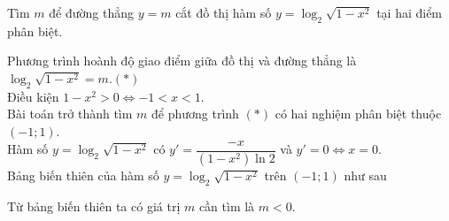 \begin{bt}%
Tìm $m$ để đường thẳng $y=m$ cắt đồ thị hàm số $y=\log_2\sqrt{1-x^2}$ tại hai điểm phân biệt.
\loigiai
{Phương trình hoành độ giao điểm giữa đồ thị và đường thẳng là $\log_2\sqrt{1-x^2}=m$.\quad $(*)$\\
Điều kiện $1-x^2>0\Leftrightarrow -1<x<1$.\\
Bài toán trở thành tìm $m$ để phương trình $(*)$ có hai nghiệm phân biệt thuộc $(-1;1)$.\\
Hàm số $y=\log_2\sqrt{1-x^2}$ có $y'=\dfrac{-x}{(1-x^2)\ln 2}$ và $y'=0\Leftrightarrow x=0$.\\
Bảng biến thiên của hàm số $y=\log_2\sqrt{1-x^2}$ trên $(-1;1)$ như sau
\begin{center}
\end{center}
Từ bảng biến thiên ta có giá trị $m$ cần tìm là $m<0$.
}
\end{bt}

